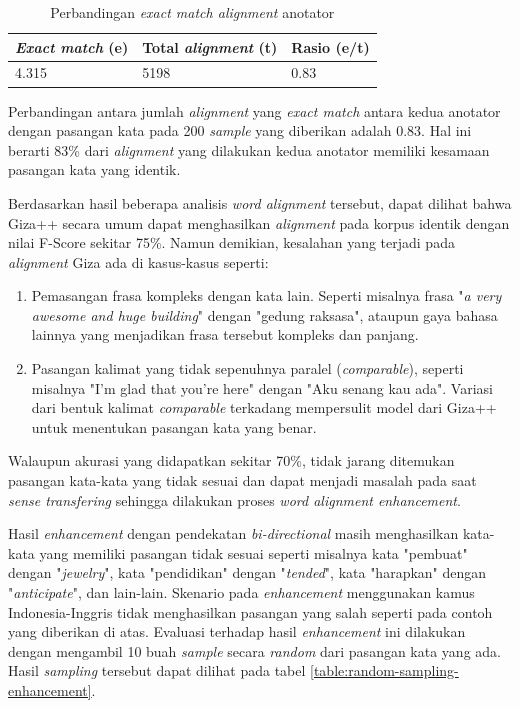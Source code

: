 \begin{table}
	\centering
	\caption{Perbandingan \textit{exact match alignment} anotator}
	\label{table:exact-match-anotator}
	\begin{tabular}{|p{3cm}|p{3cm}|p{3cm}|}
		\hline
		\textbf{\textit{Exact match} (e)} & \textbf{Total \textit{alignment} (t)} & \textbf{Rasio (e/t)}
		\\ \hline
		4.315 & 5198 & 0.83 \\ \hline
	\end{tabular} 
\end{table}
 
Perbandingan antara jumlah \textit{alignment} yang \textit{exact match} antara kedua anotator dengan pasangan kata pada 200 \textit{sample} yang diberikan adalah 0.83. Hal ini berarti 83\% dari \textit{alignment} yang dilakukan kedua anotator memiliki kesamaan pasangan kata yang identik.

Berdasarkan hasil beberapa analisis \textit{word alignment} tersebut, dapat dilihat bahwa Giza++ secara umum dapat menghasilkan \textit{alignment} pada korpus identik dengan nilai F-Score sekitar 75\%. Namun demikian, kesalahan yang terjadi pada \textit{alignment} Giza ada di kasus-kasus seperti:

\begin{enumerate}
	\item Pemasangan frasa kompleks dengan kata lain. Seperti misalnya frasa "\textit{a very awesome and huge building}" dengan "gedung raksasa", ataupun gaya bahasa lainnya yang menjadikan frasa tersebut kompleks dan panjang.
	\item Pasangan kalimat yang tidak sepenuhnya paralel (\textit{comparable}), seperti misalnya "I'm glad that you're here" dengan "Aku senang kau ada". Variasi dari bentuk kalimat \textit{comparable} terkadang mempersulit model dari Giza++ untuk menentukan pasangan kata yang benar.
\end{enumerate}

Walaupun akurasi yang didapatkan sekitar 70\%, tidak jarang ditemukan pasangan kata-kata yang tidak sesuai dan dapat menjadi masalah pada saat \textit{sense transfering} sehingga dilakukan proses \textit{word alignment enhancement}.

Hasil \textit{enhancement} dengan pendekatan \textit{bi-directional} masih menghasilkan kata-kata yang memiliki pasangan tidak sesuai seperti misalnya kata "pembuat" dengan "\textit{jewelry}", kata "pendidikan" dengan "\textit{tended}", kata "harapkan" dengan "\textit{anticipate}", dan lain-lain. Skenario pada \textit{enhancement} menggunakan kamus Indonesia-Inggris tidak menghasilkan pasangan yang salah seperti pada contoh yang diberikan di atas. Evaluasi terhadap hasil \textit{enhancement} ini dilakukan dengan mengambil 10 buah \textit{sample} secara \textit{random} dari pasangan kata yang ada. Hasil \textit{sampling} tersebut dapat dilihat pada tabel \ref{table:random-sampling-enhancement}.

